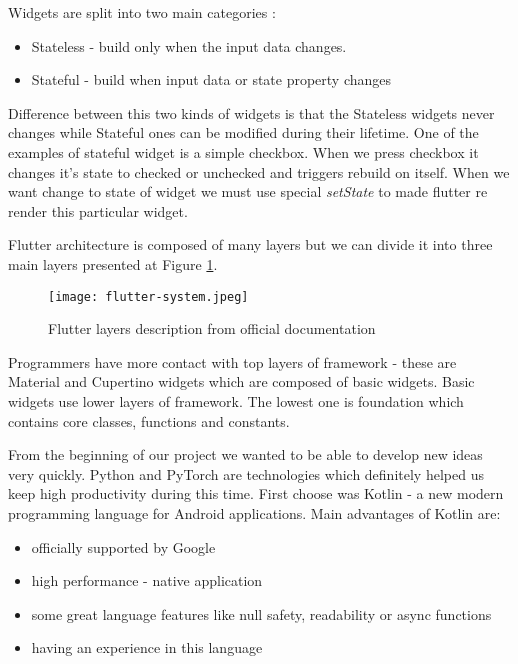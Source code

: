 \documentclass[../Main.tex]{subfiles}
\begin{document}
        
        Widgets are split into two main categories \cite{flutter-docs2}:
        \begin{itemize}
             \item Stateless - build only when the input data changes. 
             \item Stateful - build when input data or state property changes 
        \end{itemize}
        Difference between this two kinds of widgets is that the Stateless widgets
        never changes while Stateful ones can be modified during their lifetime.
        One of the examples of stateful widget is a simple checkbox. When we press checkbox
        it changes it's state to checked or unchecked and triggers rebuild on itself.
        When we want change to state of widget we must use special 
        \textit{setState} to made flutter re render this particular widget.
    
        
        Flutter architecture is composed of many layers \cite{flutter-docs} but we can divide it into 
        three main layers presented at Figure \ref{fig:flutter-layers}.
        \begin{figure}[h]
            \centering
            \texttt{[image: flutter-system.jpeg]}
            \caption{Flutter layers description from official documentation}
            \label{fig:flutter-layers}
        \end{figure}
        Programmers have more contact with top layers of framework - 
        these are Material and Cupertino widgets which are composed of basic widgets.
        Basic widgets use lower layers of framework. 
        The lowest one is foundation which contains core classes, functions and constants.
    
    
        From the beginning of our project we wanted to be able to develop new ideas
        very quickly.
        Python and PyTorch are technologies which definitely helped us keep high
        productivity during this time. First choose was Kotlin - a new modern programming 
        language for Android applications. Main advantages of Kotlin are:
            \begin{itemize}
                \item officially supported by Google
                \item high performance - native application
                \item some great language features like null safety, readability or async functions
                \item having an experience in this language
            \end{itemize}
            
\end{document}
